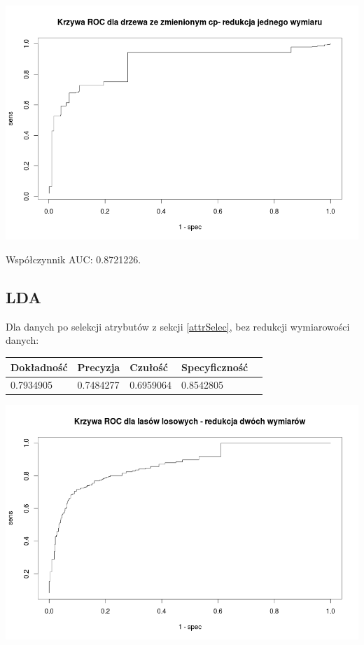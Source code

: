 \documentclass{article}
\begin{document}
\begin{center}
	\includegraphics[scale=0.40]{images/cptree2.png}
\end{center}

Współczynnik AUC: 0.8721226.

\subsection{LDA}

Dla danych po selekcji atrybutów z sekcji \ref{attrSelec}, bez redukcji wymiarowości danych:

\begin{center}
    \begin{tabular}{| l | l | l | l | l|}
    \hline
        Dokładność &  Precyzja &  Czułość & Specyficzność \\ \hline
      	0.7934905 & 0.7484277 & 0.6959064 & 0.8542805 \\
    \hline
    \end{tabular}
\end{center}

\begin{center}
	\includegraphics[scale=0.40]{images/forest2.png}
\end{center}
\end{document}
